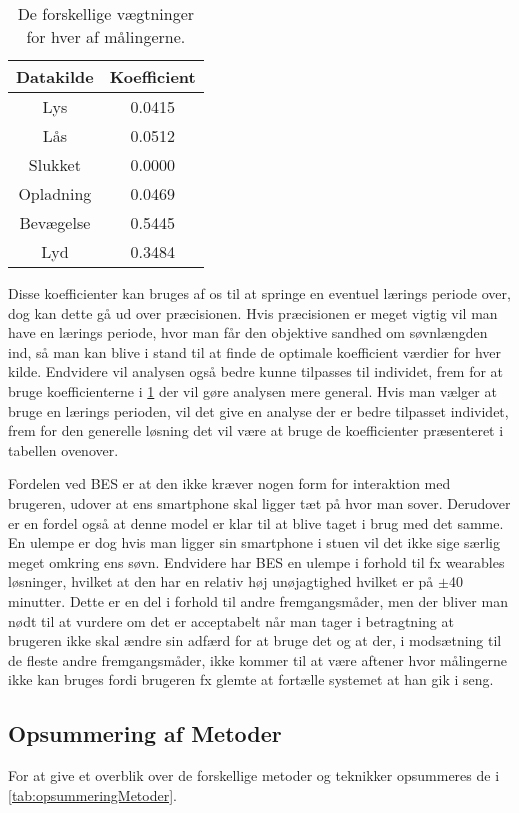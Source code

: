 \begin{table}[h]
\centering
\begin{tabular}{|c|c|}
\hline Datakilde & Koefficient\\
\hline Lys & 0.0415 \\ 
\hline Lås & 0.0512 \\ 
\hline Slukket & 0.0000 \\ 
\hline Opladning & 0.0469 \\ 
\hline Bevægelse & 0.5445 \\ 
\hline Lyd & 0.3484 \\ 
\hline 
\end{tabular}
\caption{De forskellige vægtninger for hver af målingerne.}
\label{tab:vaegtninger}
\end{table}

Disse koefficienter kan bruges af os til at springe en eventuel lærings periode over, dog kan dette gå ud over præcisionen.
Hvis præcisionen er meget vigtig vil man have en lærings periode, hvor man får den objektive sandhed om søvnlængden ind, så man kan blive i stand til at finde de optimale koefficient værdier for hver kilde.
Endvidere vil analysen også bedre kunne tilpasses til individet, frem for at bruge koefficienterne i \cref{tab:vaegtninger} der vil gøre analysen mere general.
Hvis man vælger at bruge en lærings perioden, vil det give en analyse der er bedre tilpasset individet, frem for den generelle løsning det vil være at bruge de koefficienter præsenteret i tabellen ovenover.

Fordelen ved BES er at den ikke kræver nogen form for interaktion med brugeren, udover at ens smartphone skal ligger tæt på hvor man sover.
Derudover er en fordel også at denne model er klar til at blive taget i brug med det samme.
En ulempe er dog hvis man ligger sin smartphone i stuen vil det ikke sige særlig meget omkring ens søvn.
Endvidere har BES en ulempe i forhold til fx wearables løsninger, hvilket at den har en relativ høj unøjagtighed hvilket er på $\pm$40 minutter. 
Dette er en del i forhold til andre fremgangsmåder, men der bliver man nødt til at vurdere om det er acceptabelt når man tager i betragtning at brugeren ikke skal ændre sin adfærd for at bruge det og at der, i modsætning til de fleste andre fremgangsmåder, ikke kommer til at være aftener hvor målingerne ikke kan bruges fordi brugeren fx glemte at fortælle systemet at han gik i seng.

\subsection{Opsummering af Metoder}
For at give et overblik over de forskellige metoder og teknikker opsummeres de i \cref{tab:opsummeringMetoder}.

